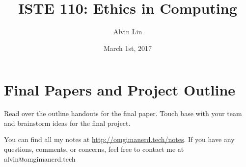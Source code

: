 \documentclass[letterpaper, 12pt]{article}
\title{ISTE 110: Ethics in Computing}
\author{Alvin Lin}
\date{March 1st, 2017}
\begin{document}
\maketitle

\section*{Final Papers and Project Outline}
Read over the outline handouts for the final paper.
Touch base with your team and brainstorm ideas for the final project.

\begin{center}
  You can find all my notes at \url{http://omgimanerd.tech/notes}. If you have
  any questions, comments, or concerns, feel free to contact me at
  alvin@omgimanerd.tech
\end{center}
\end{document}
